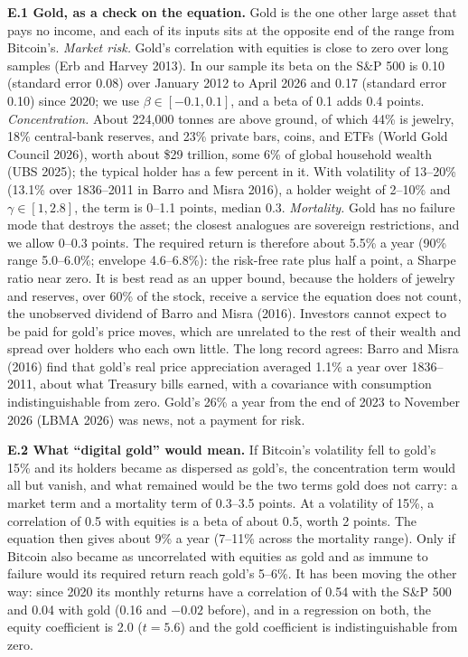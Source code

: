 \documentclass[11pt]{article}
\begin{document}
\textbf{E.1 Gold, as a check on the equation.} Gold is the one other large asset that pays no income, and each of its inputs sits at the opposite end of the range from Bitcoin's. \emph{Market risk.} Gold's correlation with equities is close to zero over long samples (Erb and Harvey 2013). In our sample its beta on the S\&P 500 is 0.10 (standard error 0.08) over January 2012 to April 2026 and 0.17 (standard error 0.10) since 2020; we use $\beta \in [-0.1, 0.1]$, and a beta of 0.1 adds 0.4 points. \emph{Concentration.} About 224,000 tonnes are above ground, of which 44\% is jewelry, 18\% central-bank reserves, and 23\% private bars, coins, and ETFs (World Gold Council 2026), worth about \$29 trillion, some 6\% of global household wealth (UBS 2025); the typical holder has a few percent in it. With volatility of 13--20\% (13.1\% over 1836--2011 in Barro and Misra 2016), a holder weight of 2--10\% and $\gamma \in [1, 2.8]$, the term is 0--1.1 points, median 0.3. \emph{Mortality.} Gold has no failure mode that destroys the asset; the closest analogues are sovereign restrictions, and we allow 0--0.3 points. The required return is therefore about 5.5\% a year (90\% range 5.0--6.0\%; envelope 4.6--6.8\%): the risk-free rate plus half a point, a Sharpe ratio near zero. It is best read as an upper bound, because the holders of jewelry and reserves, over 60\% of the stock, receive a service the equation does not count, the unobserved dividend of Barro and Misra (2016). Investors cannot expect to be paid for gold's price moves, which are unrelated to the rest of their wealth and spread over holders who each own little. The long record agrees: Barro and Misra (2016) find that gold's real price appreciation averaged 1.1\% a year over 1836--2011, about what Treasury bills earned, with a covariance with consumption indistinguishable from zero. Gold's 26\% a year from the end of 2023 to November 2026 (LBMA 2026) was news, not a payment for risk.

\textbf{E.2 What ``digital gold'' would mean.} If Bitcoin's volatility fell to gold's 15\% and its holders became as dispersed as gold's, the concentration term would all but vanish, and what remained would be the two terms gold does not carry: a market term and a mortality term of 0.3--3.5 points. At a volatility of 15\%, a correlation of 0.5 with equities is a beta of about 0.5, worth 2 points. The equation then gives about 9\% a year (7--11\% across the mortality range). Only if Bitcoin also became as uncorrelated with equities as gold and as immune to failure would its required return reach gold's 5--6\%. It has been moving the other way: since 2020 its monthly returns have a correlation of 0.54 with the S\&P 500 and 0.04 with gold (0.16 and $-0.02$ before), and in a regression on both, the equity coefficient is 2.0 ($t = 5.6$) and the gold coefficient is indistinguishable from zero.
\end{document}
